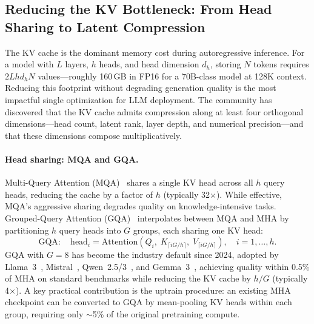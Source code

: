 \subsection{Reducing the KV Bottleneck: From Head Sharing to Latent Compression}
\label{subsec:kv-opt}

The KV cache is the dominant memory cost during autoregressive inference. For a model with $L$ layers, $h$ heads, and head dimension $d_h$, storing $N$ tokens requires $2Lhd_h N$ values---roughly 160\,GB in FP16 for a 70B-class model at 128K context. Reducing this footprint without degrading generation quality is the most impactful single optimization for LLM deployment. The community has discovered that the KV cache admits compression along at least four orthogonal dimensions---head count, latent rank, layer depth, and numerical precision---and that these dimensions compose multiplicatively.

\paragraph{Head sharing: MQA and GQA.}
Multi-Query Attention (MQA)~\cite{shazeer2019fast} shares a single KV head across all $h$ query heads, reducing the cache by a factor of $h$ (typically 32$\times$). While effective, MQA's aggressive sharing degrades quality on knowledge-intensive tasks. Grouped-Query Attention (GQA)~\cite{ainslie2023gqa} interpolates between MQA and MHA by partitioning $h$ query heads into $G$ groups, each sharing one KV head:
\begin{equation}
\text{GQA}: \quad \text{head}_i = \text{Attention}(Q_i,\; K_{\lceil iG/h \rceil},\; V_{\lceil iG/h \rceil}), \quad i = 1, \ldots, h.
\end{equation}
GQA with $G = 8$ has become the industry default since 2024, adopted by Llama~3~\cite{grattafiori2024llama3}, Mistral~\cite{jiang2023mistral}, Qwen~2.5/3~\cite{yang2024qwen25,yang2025qwen3}, and Gemma~3~\cite{gemma2025gemma3}, achieving quality within 0.5\% of MHA on standard benchmarks while reducing the KV cache by $h/G$ (typically 4$\times$). A key practical contribution is the uptrain procedure: an existing MHA checkpoint can be converted to GQA by mean-pooling KV heads within each group, requiring only $\sim$5\% of the original pretraining compute.

